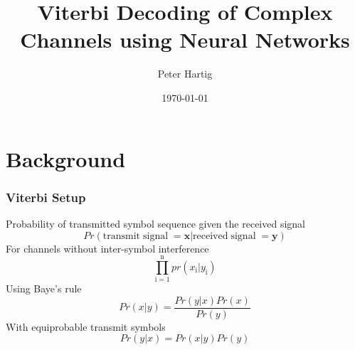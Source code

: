 \documentclass[10pt,tgadventor, onlymath]{beamer}
\title{\large \bfseries Viterbi Decoding of Complex Channels using Neural Networks}
\author{Peter Hartig\\[3ex]
}
\date{\today}
\begin{document}
\frame{
\thispagestyle{empty}
\titlepage
}

\section{Background}

\begin{frame}
\frametitle{Viterbi Setup}
	Probability of transmitted symbol sequence given the received signal
	\begin{equation}
		Pr(\mathbf{\mathrm{transmit \;signal}\;= x}|\mathbf{\mathrm{received \;signal}\; = y})
	\end{equation}
	For channels without inter-symbol interference
	\begin{equation}
		\prod_{\mathrm{i=1}}^{\mathrm{n}}pr(x_{\mathrm{i}}|y_{\mathrm{i}}) 
	\end{equation}
	Using Baye's rule
	\begin{equation}
		Pr(x|y) = \frac{Pr(y|x) Pr(x)}{Pr(y)}
	\end{equation}
	With equiprobable transmit symbols
	\begin{equation}
		Pr(y|x) = Pr(x|y) Pr(y)
	\end{equation}

\end{frame}
\end{document}
